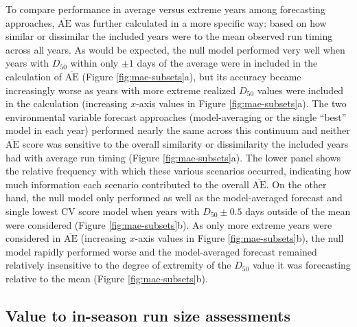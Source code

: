 \documentclass[12pt,]{book}
\theoremstyle{definition}
\theoremstyle{definition}
\theoremstyle{definition}
\theoremstyle{remark}
\begin{document}
To compare performance in average versus extreme years among forecasting
approaches, \(\overline{\text{AE}}\) was further calculated in a more
specific way: based on how similar or dissimilar the included years were
to the mean observed run timing across all years. As would be expected,
the null model performed very well when years with \(D_{50}\) within
only \(\pm 1\) days of the average were in included in the calculation
of \(\overline{\text{AE}}\) (Figure \ref{fig:mae-subsets}a), but its
accuracy became increasingly worse as years with more extreme realized
\(D_{50}\) values were included in the calculation (increasing
\(x\)-axis values in Figure \ref{fig:mae-subsets}a). The two
environmental variable forecast approaches (model-averaging or the
single ``best'' model in each year) performed nearly the same across
this continuum and neither \(\overline{\text{AE}}\) score was sensitive
to the overall similarity or dissimilarity the included years had with
average run timing (Figure \ref{fig:mae-subsets}a). The lower panel
shows the relative frequency with which these various scenarios
occurred, indicating how much information each scenario contributed to
the overall \(\overline{\text{AE}}\). On the other hand, the null model
only performed as well as the model-averaged forecast and single lowest
CV score model when years with \(D_{50} \pm 0.5\) days outside of the
mean were considered (Figure \ref{fig:mae-subsets}b). As only more
extreme years were considered in \(\overline{\text{AE}}\) (increasing
\(x\)-axis values in Figure \ref{fig:mae-subsets}b), the null model
rapidly performed worse and the model-averaged forecast remained
relatively insensitive to the degree of extremity of the \(D_{50}\)
value it was forecasting relative to the mean (Figure
\ref{fig:mae-subsets}b).

\subsection{Value to in-season run size
assessments}\label{value-to-in-season-run-size-assessments}
\end{document}
